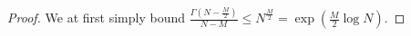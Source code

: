 \documentclass[12pt]{article}
\numberwithin{equation}{section}
\numberwithin{equation}{section}
\theoremstyle{definition}
\renewcommand{\1}{\bf 1}
\begin{document}
\begin{proof}
\noindent
%


We at first simply bound $\frac{\Gamma\left( N-\frac{M}{2} \right)}{N-M}\le N^{\frac{M}{2}}= \exp\left( \frac{M}{2}\log N \right)$. 


\end{proof}
\end{document}
